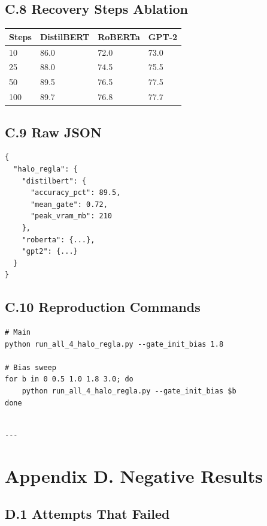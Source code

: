 \subsection{C.8 Recovery Steps Ablation}

\begin{table}[H]
\centering
\small
\begin{tabular}{llll}
\toprule
\textbf{Steps} & \textbf{DistilBERT} & \textbf{RoBERTa} & \textbf{GPT-2} \\
\midrule
10 & 86.0 & 72.0 & 73.0 \\
25 & 88.0 & 74.5 & 75.5 \\
50 & 89.5 & 76.5 & 77.5 \\
100 & 89.7 & 76.8 & 77.7 \\
\bottomrule
\end{tabular}
\end{table}

\subsection{C.9 Raw JSON}

\begin{lstlisting}
{
  "halo_regla": {
    "distilbert": {
      "accuracy_pct": 89.5,
      "mean_gate": 0.72,
      "peak_vram_mb": 210
    },
    "roberta": {...},
    "gpt2": {...}
  }
}
\end{lstlisting}

\subsection{C.10 Reproduction Commands}

\begin{lstlisting}
# Main
python run_all_4_halo_regla.py --gate_init_bias 1.8

# Bias sweep
for b in 0 0.5 1.0 1.8 3.0; do
    python run_all_4_halo_regla.py --gate_init_bias $b
done
\end{lstlisting}
\begin{lstlisting}

---
\end{lstlisting}


\section{Appendix D. Negative Results}

\subsection{D.1 Attempts That Failed}

